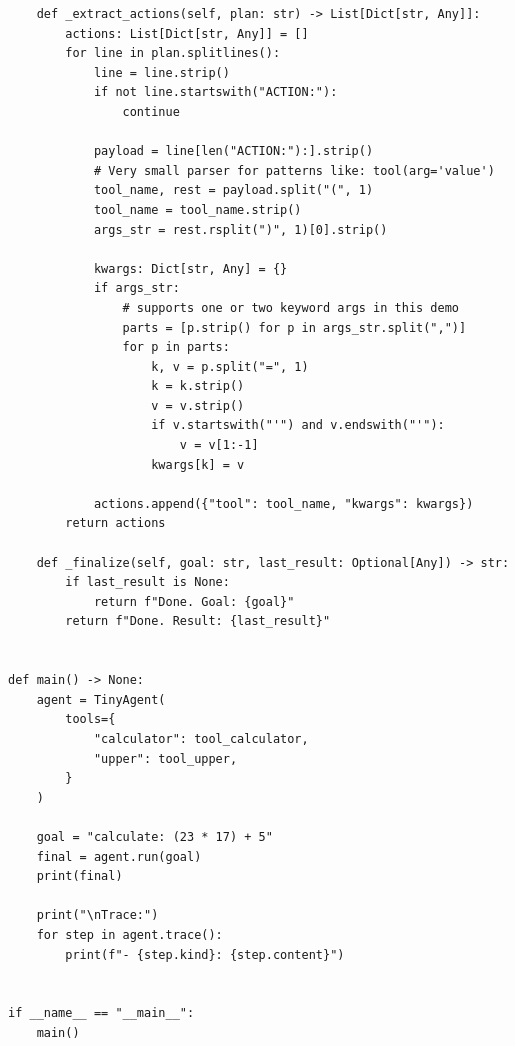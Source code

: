\documentclass[a4paper]{article}
\begin{document}
\begin{verbatim}
    def _extract_actions(self, plan: str) -> List[Dict[str, Any]]:
        actions: List[Dict[str, Any]] = []
        for line in plan.splitlines():
            line = line.strip()
            if not line.startswith("ACTION:"):
                continue

            payload = line[len("ACTION:"):].strip()
            # Very small parser for patterns like: tool(arg='value')
            tool_name, rest = payload.split("(", 1)
            tool_name = tool_name.strip()
            args_str = rest.rsplit(")", 1)[0].strip()

            kwargs: Dict[str, Any] = {}
            if args_str:
                # supports one or two keyword args in this demo
                parts = [p.strip() for p in args_str.split(",")]
                for p in parts:
                    k, v = p.split("=", 1)
                    k = k.strip()
                    v = v.strip()
                    if v.startswith("'") and v.endswith("'"):
                        v = v[1:-1]
                    kwargs[k] = v

            actions.append({"tool": tool_name, "kwargs": kwargs})
        return actions

    def _finalize(self, goal: str, last_result: Optional[Any]) -> str:
        if last_result is None:
            return f"Done. Goal: {goal}"
        return f"Done. Result: {last_result}"


def main() -> None:
    agent = TinyAgent(
        tools={
            "calculator": tool_calculator,
            "upper": tool_upper,
        }
    )

    goal = "calculate: (23 * 17) + 5"
    final = agent.run(goal)
    print(final)

    print("\nTrace:")
    for step in agent.trace():
        print(f"- {step.kind}: {step.content}")


if __name__ == "__main__":
    main()
    
    \end{verbatim}
\end{document}
